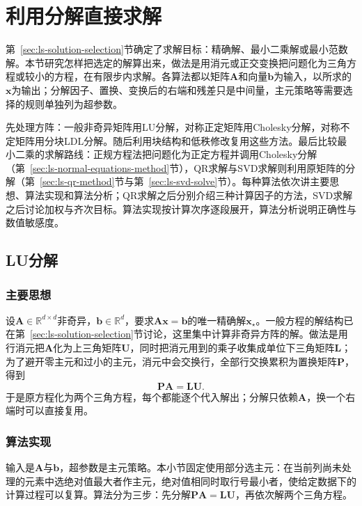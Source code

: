 \section{利用分解直接求解}
\label{sec:ls-direct-methods}

第~\ref{sec:ls-solution-selection}节确定了求解目标：精确解、最小二乘解或最小范数解。本节研究怎样把选定的解算出来，做法是用消元或正交变换把问题化为三角方程或较小的方程，在有限步内求解。各算法都以矩阵$\bm A$和向量$\bm b$为输入，以所求的$\bm x$为输出；分解因子、置换、变换后的右端和残差只是中间量，主元策略等需要选择的规则单独列为超参数。

先处理方阵：一般非奇异矩阵用LU分解，对称正定矩阵用Cholesky分解，对称不定矩阵用分块LDL分解。随后利用块结构和低秩修改复用这些方法。最后比较最小二乘的求解路线：正规方程法把问题化为正定方程并调用Cholesky分解（第~\ref{sec:ls-normal-equations-method}节），QR求解与SVD求解则利用原矩阵的分解（第~\ref{sec:ls-qr-method}节与第~\ref{sec:ls-svd-solve}节）。每种算法依次讲主要思想、算法实现和算法分析；QR求解之后分别介绍三种计算因子的方法，SVD求解之后讨论加权与齐次目标。算法实现按计算次序逐段展开，算法分析说明正确性与数值敏感度。

\subsection{LU分解}
\label{sec:ls-lu}

\subsubsection{主要思想}
设$\bm A\in\mathbb R^{d\times d}$非奇异，$\bm b\in\mathbb R^d$，要求$\bm A\bm x=\bm b$的唯一精确解$\bm x_\star$。一般方程的解结构已在第~\ref{sec:ls-solution-selection}节讨论，这里集中计算非奇异方阵的解。做法是用行消元把$\bm A$化为上三角矩阵$\bm U$，同时把消元用到的乘子收集成单位下三角矩阵$\bm L$；为了避开零主元和过小的主元，消元中会交换行，全部行交换累积为置换矩阵$\bm P$，得到
\begin{equation}
 \bm P\bm A=\bm L\bm U.
 \label{eq:ls-palu}
\end{equation}
于是原方程化为两个三角方程，每个都能逐个代入解出；分解只依赖$\bm A$，换一个右端时可以直接复用。

\subsubsection{算法实现}
输入是$\bm A$与$\bm b$，超参数是主元策略。本小节固定使用部分选主元：在当前列尚未处理的元素中选绝对值最大者作主元，绝对值相同时取行号最小者，使给定数据下的计算过程可以复算。算法分为三步：先分解$\bm P\bm A=\bm L\bm U$，再依次解两个三角方程。

